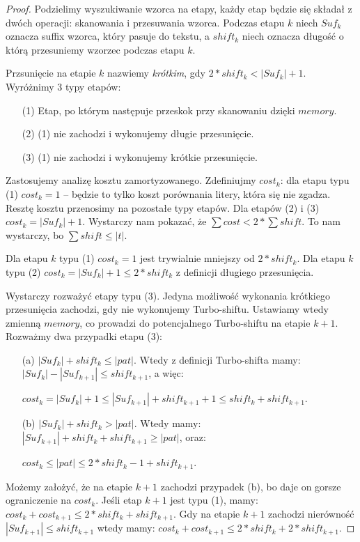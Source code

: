 \documentclass[12pt]{article}
\theoremstyle{plain}
\begin{document}
\begin{proof}
	Podzielimy wyszukiwanie wzorca na etapy, każdy etap będzie się składał z dwóch operacji: skanowania i przesuwania wzorca. Podczas etapu $k$ niech $Suf_k$ oznacza suffix wzorca, który pasuje do tekstu, a $shift_k$ niech oznacza długość o którą przesuniemy wzorzec podczas etapu $k$.

	Przsunięcie na etapie $k$ nazwiemy \emph{krótkim}, gdy $2*shift_k < |Suf_k| + 1$. Wyróżnimy 3 typy etapów:
	\begin{itemize}
		\item[(1)] Etap, po którym następuje przeskok przy skanowaniu dzięki $memory$.
		\item[(2)] (1) nie zachodzi i wykonujemy długie przesunięcie.
		\item[(3)] (1) nie zachodzi i wykonujemy krótkie przesunięcie. 
	\end{itemize}

	Zastosujemy analizę kosztu zamortyzowanego. Zdefiniujmy $cost_k$: dla etapu typu (1) $cost_k = 1$ -- będzie to tylko koszt porównania litery, która się nie zgadza. Resztę kosztu przenosimy na pozostałe typy etapów. Dla etapów (2) i (3) $cost_k = |Suf_k| + 1$. Wystarczy nam pokazać, że $\sum cost < 2* \sum shift$. To nam wystarczy, bo $\sum shift \leq |t|$.

	Dla etapu $k$ typu (1) $cost_k = 1$ jest trywialnie mniejszy od $2 * shift_k$. Dla etapu $k$ typu (2) $cost_k = |Suf_k| + 1 \leq 2 * shift_k$ z definicji długiego przesunięcia.

	Wystarczy rozważyć etapy typu (3). Jedyna możliwość wykonania krótkiego przesunięcia zachodzi, gdy nie wykonujemy Turbo-shiftu. Ustawiamy wtedy zmienną $memory$, co prowadzi do potencjalnego Turbo-shiftu na etapie $k+1$. Rozważmy dwa przypadki etapu (3):
	\begin{itemize}
		\item [(a)] $|Suf_k| + shift_k \leq |pat|$. Wtedy z definicji Turbo-shifta mamy: $|Suf_k| - |Suf_{k+1}| \leq shift_{k+1}$, a więc: \\
		\centerline{$cost_k = |Suf_{k}|+1 \leq |Suf_{k+1}| + shift_{k+1} + 1 \leq shift_k + shift_{k+1}$.}
		\item [(b)] $|Suf_k| + shift_k > |pat|$. Wtedy mamy: $|Suf_{k+1}| + shift_k + shift_{k+1} \geq |pat|$, oraz: \\
		\centerline{$cost_k \leq |pat| \leq 2 * shift_k -1 + shift_{k+1}$.}
	\end{itemize}

	Możemy założyć, że na etapie $k+1$ zachodzi przypadek (b), bo daje on gorsze ograniczenie na $cost_k$. Jeśli etap $k+1$ jest typu (1), mamy: $cost_k + cost_{k+1} \leq 2 * shift_k + shift_{k+1}$. Gdy na etapie $k+1$ zachodzi nierówność $|Suf_{k+1}| \leq shift_{k+1}$ wtedy mamy: $cost_k + cost_{k+1} \leq 2 * shift_k + 2* shift_{k+1}$.


\end{proof}
\end{document}
